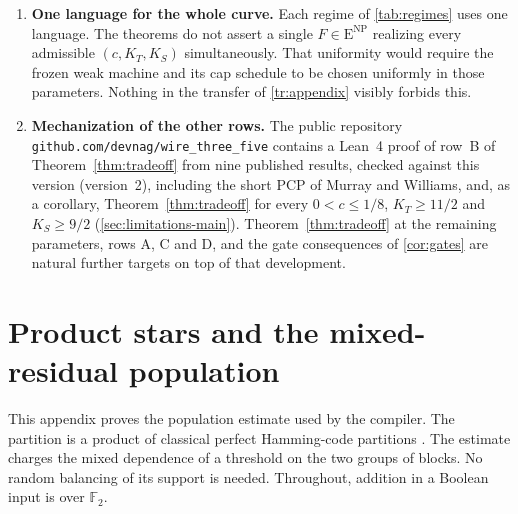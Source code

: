 \documentclass[11pt,letterpaper]{article}
\theoremstyle{definition}
\theoremstyle{remark}
\newcommand{\F}{\mathbb F}
\newcommand{\ENP}{\mathrm{E}^{\mathrm{NP}}}
\begin{document}
\begin{enumerate}
\item \textbf{One language for the whole curve.} Each regime of
\cref{tab:regimes} uses one language. The theorems do not assert a
single $F\in\ENP$ realizing every admissible $(c,K_T,K_S)$
simultaneously. That uniformity would require the frozen weak machine
and its cap schedule to be chosen uniformly in those parameters.
Nothing in the transfer of \cref{tr:appendix} visibly forbids this.

\item \textbf{Mechanization of the other rows.} The public repository
\nolinkurl{github.com/devnag/wire_three_five} contains a Lean~4 proof
of row~B of Theorem~\ref{thm:tradeoff} from nine published results,
checked against this version (version~2), including the short PCP of
Murray and Williams, and, as a corollary, Theorem~\ref{thm:tradeoff}
for every $0<c\le1/8$, $K_T\ge11/2$ and $K_S\ge9/2$
(\cref{sec:limitations-main}). Theorem~\ref{thm:tradeoff} at the
remaining parameters, rows A, C and D, and the gate consequences of
\cref{cor:gates} are natural further targets on top of that
development.
\end{enumerate}

\clearpage
\appendix


\section{Product stars and the mixed-residual population}
\label{star:appendix}

This appendix proves the population estimate used by the compiler.
The partition is a product of classical perfect Hamming-code partitions
\cite{Hamming}. The estimate charges the mixed dependence of a threshold
on the two groups of blocks. No random balancing of its support is needed.
Throughout, addition in a Boolean input is over $\F_2$.
\end{document}
